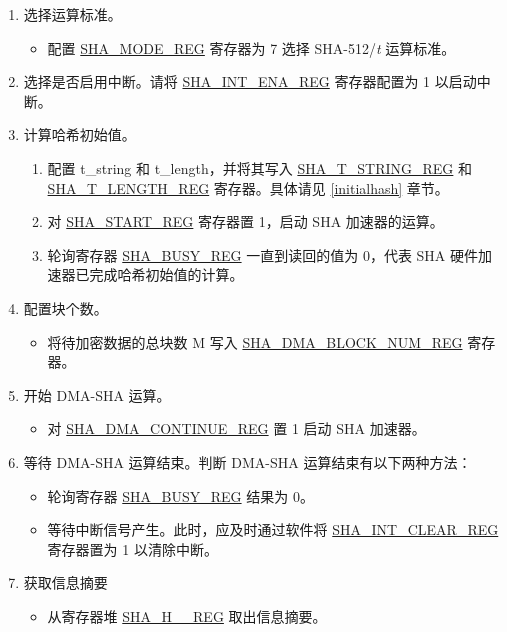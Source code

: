 \documentclass[main\_\_CN.tex]{subfiles}
\begin{document}
\begin{enumerate}
    \item 选择运算标准。
        \begin{itemize}
            \item 配置 \hyperref[regdesc:SHAMODEREG]{SHA\_MODE\_REG} 寄存器为 7 选择 SHA-512/{\it{t}} 运算标准。
        \end{itemize}
    \item 选择是否启用中断。请将 \hyperref[regdesc:SHAINTENAREG]{SHA\_INT\_ENA\_REG} 寄存器配置为 1 以启动中断。
    \item 计算哈希初始值。
        \begin{enumerate}
            \item 配置 t\_string 和 t\_length，并将其写入 \hyperref[regdesc:SHATSTRINGREG]{SHA\_T\_STRING\_REG} 和 \hyperref[regdesc:SHATLENGTHREG]{SHA\_T\_LENGTH\_REG} 寄存器。具体请见 \ref{initialhash} 章节。
            \item 对 \hyperref[regdesc:SHASTARTREG]{SHA\_START\_REG} 寄存器置 1，启动 SHA 加速器的运算。
            \item 轮询寄存器 \hyperref[regdesc:SHABUSYREG]{SHA\_BUSY\_REG} 一直到读回的值为 0，代表 SHA 硬件加速器已完成哈希初始值的计算。
        \end{enumerate}
    \item 配置块个数。
        \begin{itemize}
            \item 将待加密数据的总块数 M 写入  \hyperref[regdesc:SHADMABLOCKNUMREG]{SHA\_DMA\_BLOCK\_NUM\_REG} 寄存器。
        \end{itemize}
    \item 开始 DMA-SHA 运算。
        \begin{itemize}
            \item 对 \hyperref[regdesc:SHADMACONTINUEREG]{SHA\_DMA\_CONTINUE\_REG} 置 1 启动 SHA 加速器。
        \end{itemize}
    \item 等待 DMA-SHA 运算结束。判断 DMA-SHA 运算结束有以下两种方法：
        \begin{itemize}
            \item 轮询寄存器 \hyperref[regdesc:SHABUSYREG]{SHA\_BUSY\_REG} 结果为 0。
            \item 等待中断信号产生。此时，应及时通过软件将 \hyperref[regdesc:SHAINTCLEARREG]{SHA\_INT\_CLEAR\_REG} 寄存器置为 1 以清除中断。
        \end{itemize}
    \item 获取信息摘要
        \begin{itemize}
            \item 从寄存器堆 \hyperref[regdesc:SHAHNREG]{SHA\_H\_\_REG} 取出信息摘要。
        \end{itemize}
\end{enumerate}
\end{document}
